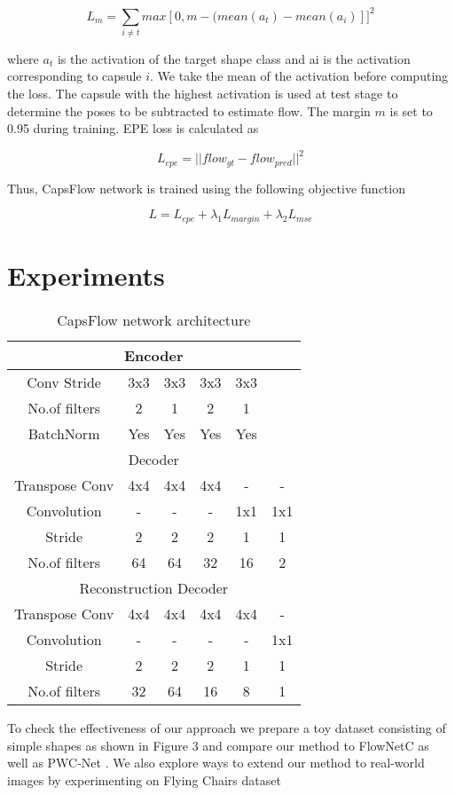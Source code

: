 \documentclass[11pt]{article}
\begin{document}
    \[{L_{m}} =  \sum_{i \neq t} max[0, m-(mean(a_{t}) - mean(a_{i})]]^{2}\]


where \(a_{t}\) is the activation of the target shape class and ai
is
the activation corresponding to capsule \(i\). We take the mean
of the activation before computing the loss. The capsule
with the highest activation is used at test stage to determine
the poses to be subtracted to estimate flow. The margin \(m\) is
set to 0.95 during training. EPE loss is calculated as


    \[{L_{epe}} = || flow_{gt} - flow_{pred} ||^{2}\]


Thus, CapsFlow network is trained using the following objective function


    \[{L} = L_{epe} + \lambda_{1}L_{margin} + \lambda_{2}L_{mse}\]


\section{Experiments}

\begin{table}
\begin{center}
\begin{tabular}{ c | c c c c c} 
 \hline
 \multicolumn{6}{c}{Encoder} \\
 \hline
 Conv Stride & 3x3 & 3x3 & 3x3 & 3x3 & \\
 No.of filters & 2 & 1 & 2 & 1 & \\
 BatchNorm & Yes & Yes & Yes & Yes & \\
 \hline
 \multicolumn{6}{c}{Decoder} \\
 \hline
 Transpose Conv & 4x4 & 4x4 & 4x4 & - & - \\
 Convolution & - & - & - & 1x1 & 1x1 \\
 Stride & 2 & 2 & 2 & 1 & 1 \\
 No.of filters & 64 & 64 & 32 & 16 & 2 \\
 \hline
\multicolumn{6}{c}{Reconstruction Decoder} \\
\hline
Transpose Conv & 4x4 & 4x4 & 4x4 & 4x4 & - \\
 Convolution & - & - & - & - & 1x1 \\
 Stride & 2 & 2 & 2 & 1 & 1 \\
 No.of filters & 32 & 64 & 16 & 8 & 1 \\
 \hline
\end{tabular}
\end{center}
\caption{CapsFlow network architecture}
\end{table}
To check the effectiveness of our approach we prepare
a toy dataset consisting of simple shapes as shown in Figure 3 and compare our method to FlowNetC \cite{3} as well as
PWC-Net \cite{15}. We also explore ways to extend our method
to real-world images by experimenting on Flying Chairs
dataset
\end{document}
